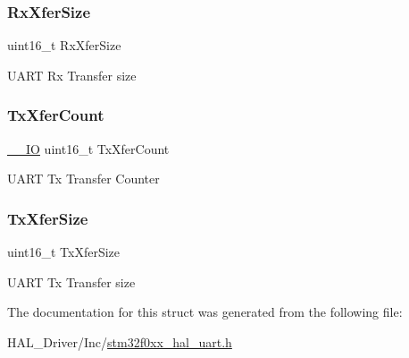 \subsubsection{\texorpdfstring{Rx\+Xfer\+Size}{RxXferSize}}
{\footnotesize\ttfamily uint16\+\_\+t Rx\+Xfer\+Size}

U\+A\+RT Rx Transfer size \mbox{\label{struct_u_a_r_t___handle_type_def_a1823437fbed80bdd1510782ced4e5532}} 
\subsubsection{\texorpdfstring{Tx\+Xfer\+Count}{TxXferCount}}
{\footnotesize\ttfamily \hyperlink{core__sc300_8h_aec43007d9998a0a0e01faede4133d6be}{\+\_\+\+\_\+\+IO} uint16\+\_\+t Tx\+Xfer\+Count}

U\+A\+RT Tx Transfer Counter \mbox{\label{struct_u_a_r_t___handle_type_def_a80907b65d6f9541bc0dee444d16bc45b}} 
\subsubsection{\texorpdfstring{Tx\+Xfer\+Size}{TxXferSize}}
{\footnotesize\ttfamily uint16\+\_\+t Tx\+Xfer\+Size}

U\+A\+RT Tx Transfer size 

The documentation for this struct was generated from the following file\+:\begin{DoxyCompactItemize}
\item 
H\+A\+L\+\_\+\+Driver/\+Inc/\hyperlink{stm32f0xx__hal__uart_8h}{stm32f0xx\+\_\+hal\+\_\+uart.\+h}\end{DoxyCompactItemize}
